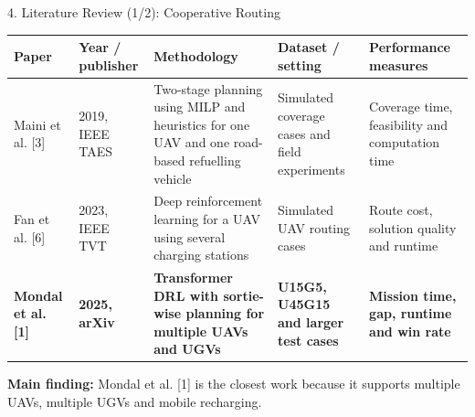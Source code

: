 \documentclass[aspectratio=169,10pt]{beamer}
\begin{document}
\begin{frame}{4. Literature Review (1/2): Cooperative Routing}
\scriptsize
\setlength{\tabcolsep}{2pt}
\renewcommand{\arraystretch}{1.35}
\begin{tabular}{P{1.9cm}P{1.5cm}P{3.7cm}P{3.0cm}P{3.1cm}}
\toprule
\textbf{Paper} & \textbf{Year / publisher} & \textbf{Methodology} & \textbf{Dataset / setting} & \textbf{Performance measures}\\
\midrule
Maini et al. [3] & 2019, IEEE TAES & Two-stage planning using MILP and heuristics for one UAV and one road-based refuelling vehicle & Simulated coverage cases and field experiments & Coverage time, feasibility and computation time\\
\addlinespace
Fan et al. [6] & 2023, IEEE TVT & Deep reinforcement learning for a UAV using several charging stations & Simulated UAV routing cases & Route cost, solution quality and runtime\\
\addlinespace
\textbf{Mondal et al. [1]} & \textbf{2025, arXiv} & \textbf{Transformer DRL with sortie-wise planning for multiple UAVs and UGVs} & \textbf{U15G5, U45G15 and larger test cases} & \textbf{Mission time, gap, runtime and win rate}\\
\bottomrule
\end{tabular}

\vspace{3mm}
\footnotesize
\textbf{Main finding:} Mondal et al. [1] is the closest work because it supports multiple UAVs, multiple UGVs and mobile recharging.
\end{frame}
\end{document}
